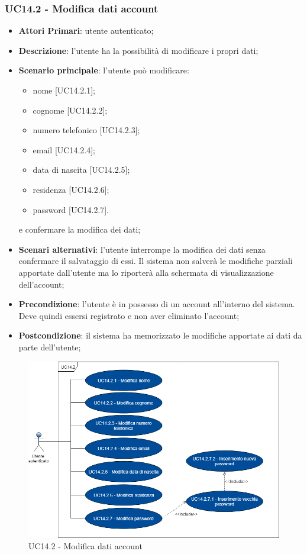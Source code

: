 \subsubsection{UC14.2 - Modifica dati account}
\begin{itemize}
	\item \textbf{Attori Primari}: utente autenticato;
	\item \textbf{Descrizione}: l'utente ha la possibilità di modificare i propri dati;
	\item \textbf{Scenario principale}: l'utente può modificare:
	\begin{itemize}
		\item nome [UC14.2.1];
		\item cognome [UC14.2.2];
		\item numero telefonico [UC14.2.3];
		\item email [UC14.2.4];
		\item data di nascita [UC14.2.5];
		\item residenza [UC14.2.6];
		\item password [UC14.2.7].
	\end{itemize}
	e confermare la modifica dei dati;
	\item \textbf{Scenari alternativi}: l'utente interrompe la modifica dei dati senza confermare il salvataggio di essi. Il sistema non salverà le modifiche parziali apportate dall'utente ma lo riporterà alla schermata di visualizzazione dell'account;	 
	\item \textbf{Precondizione}: l'utente è in possesso di un account all'interno del sistema. Deve quindi essersi registrato e non aver eliminato l'account;
	\item \textbf{Postcondizione}: il sistema ha memorizzato le modifiche apportate ai dati da parte dell’utente;
\end{itemize}
\begin{figure}[h]
	\includegraphics[width=14cm]{res/images/UC14-1Modifica.png}
	\centering
	\caption{UC14.2 - Modifica dati account}
\end{figure}
\newpage 

